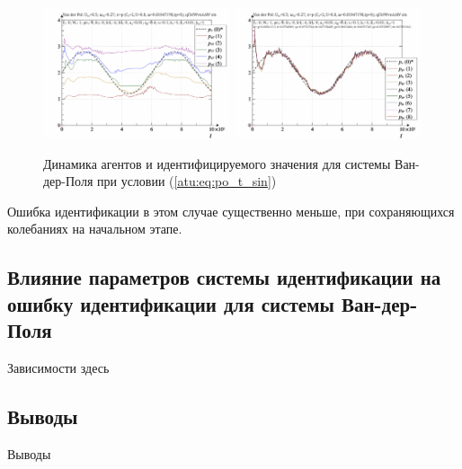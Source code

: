 \begin{figure}[ht!]
\begin{center}
  \includegraphics[width=0.49\textwidth]{p/cha/vdp/vdp_id-p_t_pi_ql3rlWvnAAW_sin.png}
  \hfill
  \includegraphics[width=0.49\textwidth]{p/cha/vdp/vdp_id-p_t_p_ql3rlWvnAAW_sin.png}
\end{center}
  \caption{Динамика агентов и идентифицируемого значения для системы Ван-дер-Поля при условии (\ref{atu:eq:po_t_sin})}
\label{atu:f:vdp_id1_sin}
\end{figure}

Ошибка идентификации в этом случае существенно меньше, при сохраняющихся
колебаниях на начальном этапе.



\subsection{Влияние параметров системы идентификации на ошибку идентификации для системы Ван-дер-Поля}  %


Зависимости здесь


\subsection{Выводы}  %

Выводы





